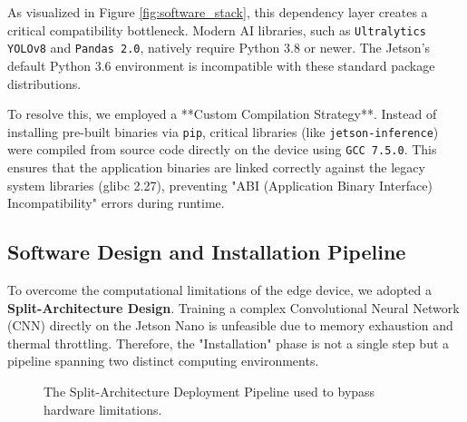 As visualized in Figure \ref{fig:software_stack}, this dependency layer creates a critical compatibility bottleneck. Modern AI libraries, such as \texttt{Ultralytics YOLOv8} and \texttt{Pandas 2.0}, natively require Python 3.8 or newer. The Jetson's default Python 3.6 environment is incompatible with these standard package distributions. 

To resolve this, we employed a **Custom Compilation Strategy**. Instead of installing pre-built binaries via \texttt{pip}, critical libraries (like \texttt{jetson-inference}) were compiled from source code directly on the device using \texttt{GCC 7.5.0}. This ensures that the application binaries are linked correctly against the legacy system libraries (glibc 2.27), preventing "ABI (Application Binary Interface) Incompatibility" errors during runtime.

\subsection{Software Design and Installation Pipeline}

To overcome the computational limitations of the edge device, we adopted a \textbf{Split-Architecture Design}. Training a complex Convolutional Neural Network (CNN) directly on the Jetson Nano is unfeasible due to memory exhaustion and thermal throttling. Therefore, the "Installation" phase is not a single step but a pipeline spanning two distinct computing environments.

\vspace{0.5cm}

\begin{figure}[htbp]
	\centering
	
	\caption{The Split-Architecture Deployment Pipeline used to bypass hardware limitations.}
	\label{fig:deployment_pipeline}
\end{figure}

